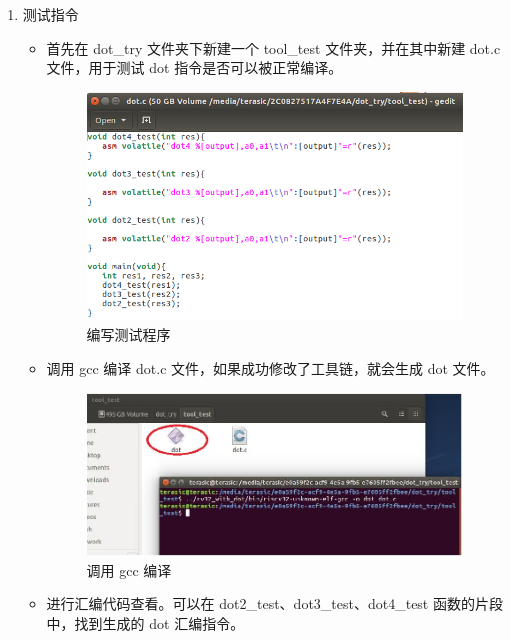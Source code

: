 \documentclass[a4paper, 14pt, oneside]{book} %
\numberwithin{equation}{subsection}
\begin{document}
\begin{enumerate}
		\item 测试指令
			\begin{itemize}
				\item 首先在 dot\_try 文件夹下新建一个 tool\_test
				文件夹，并在其中新建 dot.c 文件，用于测试 dot 指令是否可以被正常编译。
					\begin{figure}[H]
						\centering  
						\includegraphics[scale=0.6]{img/6.png} 
						\caption{编写测试程序}
					\end{figure}
				\item 调用 gcc 编译 dot.c 文件，如果成功修改了工具链，就会生成 dot 文件。
					\begin{figure}[H]
						\centering  
						\includegraphics[scale=0.8]{img/makedot.JPG} 
						\caption{调用 gcc 编译}
					\end{figure}
				\item 进行汇编代码查看。可以在 dot2\_test、dot3\_test、dot4\_test 函数的片段中，找到生成的 dot 汇编指令。
					\begin{figure}[H]
						\centering  

\end{figure}
\end{itemize}
\end{enumerate}
\end{document}
